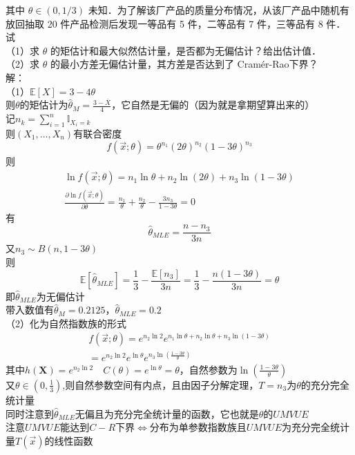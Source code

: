 \documentclass[12pt]{article}
\begin{document}
其中 $\theta \in(0,1 / 3)$ 未知．为了解该厂产品的质量分布情况，从该厂产品中随机有放回抽取 20 件产品检测后发现一等品有 5 件，二等品有 7 件，三等品有 8 件．试\\
（1）求 $\theta$ 的矩估计和最大似然估计量，是否都为无偏估计？给出估计值．\\
（2）求 $\theta$ 的最小方差无偏估计量，其方差是否达到了 Cramér-Rao下界？\\
解：\\
（1）$\mathbb{E}[X]=3-4\theta$\\
则$\theta$的矩估计为$\hat{\theta}_{M}=\frac{3-\overline{X}}{4}$，它自然是无偏的（因为就是拿期望算出来的）\\
记$n_k=\sum_{i=1}^{n} \mathbb{I}_{X_i=k}$\\
则$(X_1,...,X_n)$有联合密度$$f(\vec{x};\theta)=\theta^{n_1}(2\theta)^{n_2}(1-3\theta)^{n_3}$$
则\\
\begin{gather}
\ln f(\vec{x};\theta)=n_1 \ln \theta+n_2\ln (2\theta) +n_3\ln(1-3\theta)\\
\frac{\partial \ln f\left(\vec{x} ; \theta\right)}{\partial \theta}=\frac{n_1}{\theta}+\frac{n_2}{\theta}-\frac{3n_3}{1-3\theta}=0
\end{gather}
有$$\hat{\theta}_{MLE}=\frac{n-n_3}{3n}$$
又$n_3 \sim B(n,1-3\theta)$\\
则$$\mathbb{E}[\hat{\theta}_{MLE}]=\frac{1}{3}-\frac{\mathbb{E}[n_3]}{3n}=\frac{1}{3}-\frac{n(1-3\theta)}{3n}=\theta$$
即$\hat{\theta}_{MLE}$为无偏估计\\
带入数值有$\hat{\theta}_{M}=0.2125$，$\hat{\theta}_{MLE}=0.2$\\
（2）化为自然指数族的形式\\
\begin{gather}
f(\vec{x};\theta)=e^{n_2\ln2}e^{n_1\ln\theta+n_2\ln\theta+n_3\ln(1-3\theta)}\\
=e^{n_2\ln2}e^{\ln\theta}e^{n_3\ln(\frac{1-3\theta}{\theta})}
\end{gather}
其中$h(\boldsymbol{X})=e^{n_2\ln2} \quad C(\theta)=e^{\ln\theta}=\theta$，自然参数为$\ln(\frac{1-3\theta}{\theta})$\\
又$\theta \in (0,\frac{1}{3})$,则自然参数空间有内点，且由因子分解定理，$T=n_3$为$\theta$的充分完全统计量\\
同时注意到$\hat{\theta}_{MLE}$无偏且为充分完全统计量的函数，它也就是$\theta$的$UMVUE$\\
注意$UMVUE$能达到$C-R$下界$\iff$分布为单参数指数族且$UMVUE$为充分完全统计量$T(\vec{x})$的线性函数\\
\end{document}
